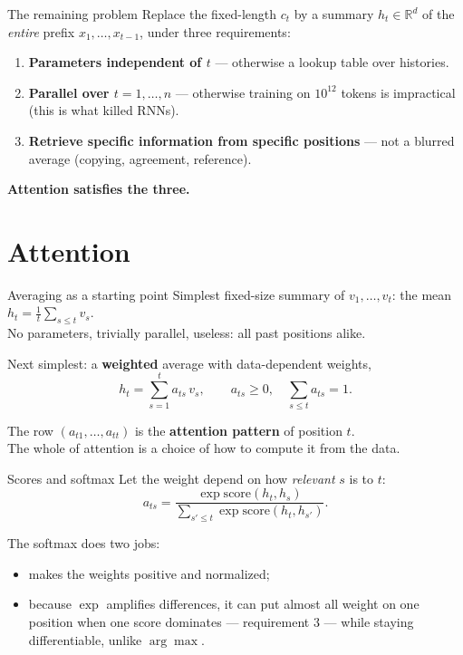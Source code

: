 \documentclass[11pt,aspectratio=169]{beamer}
\newcommand{\R}{\mathbb{R}}
\newcommand{\dest}[1]{\textcolor{structure}{\textbf{#1}}}
\begin{document}
\begin{frame}{The remaining problem}
  Replace the fixed-length $c_t$ by a summary $h_t\in\R^d$ of the \emph{entire} prefix
  $x_1,\dots,x_{t-1}$, under three requirements:

  \vspace{0.6em}
  \begin{enumerate}
    \item \textbf{Parameters independent of $t$} --- otherwise a lookup table over histories.
    \item \textbf{Parallel over $t = 1,\dots,n$} --- otherwise training on $10^{12}$ tokens is
          impractical (this is what killed RNNs).
    \item \textbf{Retrieve specific information from specific positions} --- not a blurred
          average (copying, agreement, reference).
  \end{enumerate}

  \vspace{0.8em}
  \dest{Attention satisfies the three.}
\end{frame}

\section{Attention}

\begin{frame}{Averaging as a starting point}
  Simplest fixed-size summary of $v_1,\dots,v_t$: the mean $h_t = \frac1t\sum_{s\le t}v_s$.\\
  No parameters, trivially parallel, useless: all past positions alike.

  \vspace{0.8em}
  Next simplest: a \dest{weighted} average with data-dependent weights,
  \[
    h_t = \sum_{s=1}^{t} a_{ts}\,v_s,\qquad a_{ts}\ge 0,\quad \sum_{s\le t}a_{ts} = 1 .
  \]

  \vspace{0.6em}
  The row $(a_{t1},\dots,a_{tt})$ is the \dest{attention pattern} of position $t$.\\
  The whole of attention is a choice of how to compute it from the data.
\end{frame}

\begin{frame}{Scores and softmax}
  Let the weight depend on how \emph{relevant} $s$ is to $t$:
  \[
    a_{ts} = \frac{\exp\mathrm{score}(h_t,h_s)}{\sum_{s'\le t}\exp\mathrm{score}(h_t,h_{s'})} .
  \]

  \vspace{0.8em}
  The softmax does two jobs:
  \begin{itemize}
    \item makes the weights positive and normalized;
    \item because $\exp$ amplifies differences, it can put almost all weight on one position
          when one score dominates --- requirement 3 --- while staying differentiable,
          unlike $\arg\max$.
  \end{itemize}
\end{frame}
\end{document}
